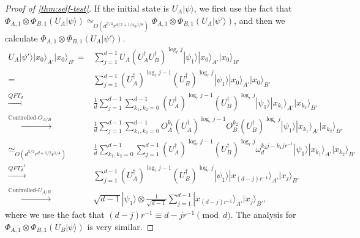 \documentclass[11pt,letterpaper]{article}
\newcommand{\ket}[1]{|#1\rangle}
\newcommand{\x}{\otimes}
\newcommand{\ct}{^{\dagger}}
\newcommand{\1}{\mathbb{1}}
\newcommand{\ep}{\epsilon}
\newcommand{\qe}{\epsilon^{1/4}}
\newcommand{\appd}[1]{\simeq_{#1}}
\theoremstyle{definition}
\begin{document}
\begin{proof}[Proof of \cref{thm:self-test}]
If the initial state is $U_A\ket{\psi}$, we first use the fact that 
$ \Phi_{A,1} \x \Phi_{B,1} (U_A\ket{\psi}) \appd{O(d^{5/4}r^{d/2+1/4} \ep^{1/8})}  \Phi_{A,1} \x \Phi_{B,1} (U_A\ket{\psi'})$, 
and then we calculate $\Phi_{A,1} \x \Phi_{B,1} (U_A\ket{\psi'})$.
\begin{align*}
	U_A \ket{\psi'} \ket{x_0}_{A'}\ket{x_0}_{B'} =&  
		\sum_{j=1}^{d-1} U_A(U_A\ct U_B\ct)^{\log_r j}\ket{\psi_1} \ket{x_0}_{A'}\ket{x_0}_{B'}\\
		=&\sum_{j=1}^{d-1}(U_A\ct)^{\log_r j-1}  (U_B\ct)^{\log_r j} \ket{\psi_1} \ket{x_0}_{A'}\ket{x_0}_{B'}\\
		\xrightarrow[]{QFT_d} &\frac{1}{d}\sum_{j=1}^{d-1} \sum_{k_1,k_2 = 0}^{d-1}(U_A\ct)^{\log_r j-1} (U_B\ct)^{\log_r j} \ket{\psi_1}  \ket{x_{k_1}}_{A'}\ket{x_{k_2}}_{B'}\\
		\xrightarrow[]{\text{Controlled-}O_{A/B}}&\frac{1}{d}\sum_{j=1}^{d-1}\sum_{k_1,k_2 = 0}^{d-1} 
		 O_A^{k_1}(U_A\ct)^{\log_r j-1} O_B^{k_2}(U_B\ct)^{\log_r j} \ket{\psi_1} 
		 \ket{x_{k_1}}_{A'}\ket{x_{k_2}}_{B'}\\
		\appd{O(d^{5/2} r^{d+1/2} \qe)}& \frac{1}{d}\sum_{k_1,k_2 = 0}^{d-1} \sum_{j=1}^{d-1} (U_A\ct)^{\log_r j-1} (U_B\ct)^{\log_r j}
		\omega_d^{k_2j-k_1jr^{-1}}\ket{\psi_1}
		 \ket{x_{k_1}}_{A'}\ket{x_{k_2}}_{B'}\\
		\xrightarrow[]{QFT_d^{-1}}& \sum_{j=1}^{d-1}  (U_A\ct)^{\log_r j-1} (U_B\ct)^{\log_r j}  
		\ket{\psi_1} \ket{x_{(d-j)r^{-1}}}_{A'}\ket{x_j}_{B'}\\
		\xrightarrow[]{\text{Controlled-}U_{A/B}}& \sqrt{d-1} \ket{\psi_1} \x  
		\frac{1}{\sqrt{d-1}} \sum_{j=1}^{d-1} \ket{x_{(d-j)r^{-1}}}_{A'}\ket{x_j}_{B'},
\end{align*}
where we use the fact that $(d-j)r^{-1} \equiv d -jr^{-1} \pmod{d}$.
The analysis for $\Phi_{A,1} \x\Phi_{B,1} (U_B \ket{\psi})$ is very similar.
\end{proof}
\end{document}
